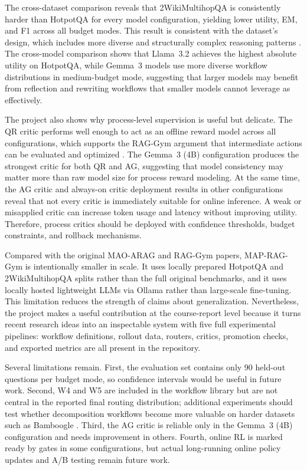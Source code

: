 \documentclass[12pt,a4paper]{article}
\begin{document}
The cross-dataset comparison reveals that 2WikiMultihopQA is consistently harder than HotpotQA for every model configuration, yielding lower utility, EM, and F1 across all budget modes. This result is consistent with the dataset's design, which includes more diverse and structurally complex reasoning patterns \cite{ho2020twowiki}. The cross-model comparison shows that Llama~3.2 achieves the highest absolute utility on HotpotQA, while Gemma~3 models use more diverse workflow distributions in medium-budget mode, suggesting that larger models may benefit from reflection and rewriting workflows that smaller models cannot leverage as effectively.

The project also shows why process-level supervision is useful but delicate. The QR critic performs well enough to act as an offline reward model across all configurations, which supports the RAG-Gym argument that intermediate actions can be evaluated and optimized \cite{xiong2025raggym}. The Gemma~3 (4B) configuration produces the strongest critic for both QR and AG, suggesting that model consistency may matter more than raw model size for process reward modeling. At the same time, the AG critic and always-on critic deployment results in other configurations reveal that not every critic is immediately suitable for online inference. A weak or misapplied critic can increase token usage and latency without improving utility. Therefore, process critics should be deployed with confidence thresholds, budget constraints, and rollback mechanisms.

Compared with the original MAO-ARAG and RAG-Gym papers, MAP-RAG-Gym is intentionally smaller in scale. It uses locally prepared HotpotQA and 2WikiMultihopQA splits rather than the full original benchmarks, and it uses locally hosted lightweight LLMs via Ollama rather than large-scale fine-tuning. This limitation reduces the strength of claims about generalization. Nevertheless, the project makes a useful contribution at the course-report level because it turns recent research ideas into an inspectable system with five full experimental pipelines: workflow definitions, rollout data, routers, critics, promotion checks, and exported metrics are all present in the repository.

Several limitations remain. First, the evaluation set contains only 90 held-out questions per budget mode, so confidence intervals would be useful in future work. Second, W4 and W5 are included in the workflow library but are not central in the reported final routing distribution; additional experiments should test whether decomposition workflows become more valuable on harder datasets such as Bamboogle \cite{press2022bamboogle}. Third, the AG critic is reliable only in the Gemma~3 (4B) configuration and needs improvement in others. Fourth, online RL is marked ready by gates in some configurations, but actual long-running online policy updates and A/B testing remain future work.
\end{document}
